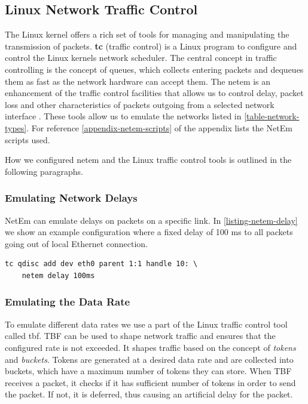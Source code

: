 \subsection{Linux Network Traffic Control}

The Linux kernel offers a rich set of tools for managing and manipulating the
transmission of packets. \textbf{tc} (traffic control) is a Linux program to
configure and control the Linux kernels network scheduler. The central concept
in traffic controlling is the concept of queues, which collects entering packets
and dequeues them as fast as the network hardware can accept them. The
\gls{netem} is an enhancement of the traffic control facilities that allows us
to control delay, packet loss and other characteristics of packets outgoing from
a selected network interface \cite{man-netem}. These tools allow us to emulate
the networks listed in \cref{table-network-types}. For reference
\cref{appendix-netem-scripts} of the appendix lists the NetEm scripts used.

How we configured \gls{netem} and the Linux traffic control tools is outlined in
the following paragraphs.


\subsubsection{Emulating Network Delays}

NetEm can emulate delays on packets on a specific link. In
\cref{listing-netem-delay} we show an example configuration where a fixed delay
of 100 ms to all packets going out of local Ethernet connection.

\begin{lstlisting}[frame=single, caption="Emulating delay", label=listing-netem-delay]
  tc qdisc add dev eth0 parent 1:1 handle 10: \
    netem delay 100ms
\end{lstlisting}

\subsubsection{Emulating the Data Rate}

To emulate different data rates we use a part of the Linux traffic control tool
called \gls{tbf}. TBF can be used to shape network traffic and ensures that the
configured rate is not exceeded. It shapes traffic based on the concept of
\textit{tokens} and \textit{buckets}. Tokens are generated at a desired data
rate and are collected into buckets, which have a maximum number of tokens they
can store. When TBF receives a packet, it checks if it has sufficient number of
tokens in order to send the packet. If not, it is deferred, thus causing an
artificial delay for the packet.

